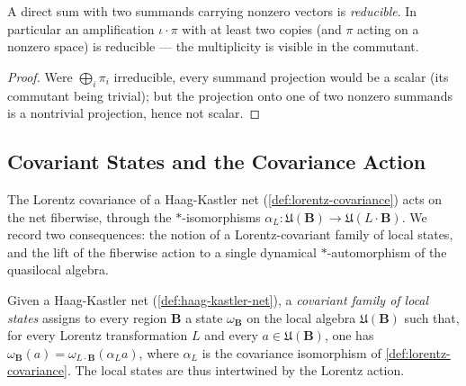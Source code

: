 \begin{theorem}
    \label{thrm:direct-sum-reducible}
    \leanok
    A direct sum with two summands carrying nonzero vectors is \emph{reducible}. In particular an amplification $\iota \cdot \pi$ with at least two copies (and $\pi$ acting on a nonzero space) is reducible --- the multiplicity is visible in the commutant.
\end{theorem}
\begin{proof}
    \leanok
    Were $\bigoplus_i \pi_i$ irreducible, every summand projection would be a scalar (its commutant being trivial); but the projection onto one of two nonzero summands is a nontrivial projection, hence not scalar.
\end{proof}

\subsection{Covariant States and the Covariance Action}

The Lorentz covariance of a Haag-Kastler net (\ref{def:lorentz-covariance}) acts on the net fiberwise, through the $*$-isomorphisms $\alpha_L : \mathfrak{U}(\mathbf{B}) \to \mathfrak{U}(L\cdot\mathbf{B})$. We record two consequences: the notion of a Lorentz-covariant family of local states, and the lift of the fiberwise action to a single dynamical $*$-automorphism of the quasilocal algebra.

\begin{definition}
    \label{def:covariant-state-family}
    \leanok
    Given a Haag-Kastler net (\ref{def:haag-kastler-net}), a \emph{covariant family of local states} assigns to every region $\mathbf{B}$ a state $\omega_{\mathbf{B}}$ on the local algebra $\mathfrak{U}(\mathbf{B})$ such that, for every Lorentz transformation $L$ and every $a \in \mathfrak{U}(\mathbf{B})$, one has $\omega_{\mathbf{B}}(a) = \omega_{L\cdot\mathbf{B}}(\alpha_L a)$, where $\alpha_L$ is the covariance isomorphism of \ref{def:lorentz-covariance}. The local states are thus intertwined by the Lorentz action.
\end{definition}

